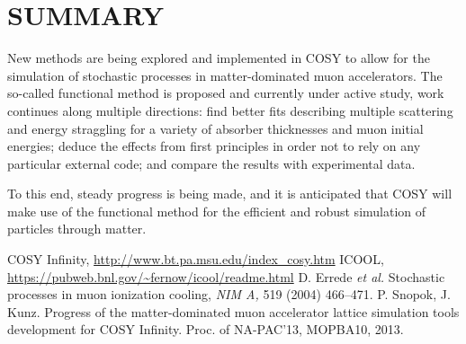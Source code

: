 \documentclass{jacow}
\begin{document}
\section{SUMMARY}
New methods are being explored and implemented in COSY to allow for the simulation of stochastic processes in matter-dominated muon accelerators. The so-called functional method is proposed and currently under active study, work continues along multiple directions: find better fits describing multiple scattering and energy straggling for a variety of absorber thicknesses and muon initial energies; deduce the effects from first principles in order not to rely on any particular external code; and compare the results with experimental data.

To this end, steady progress is being made, and it is anticipated that COSY will make use of the functional method for the efficient and robust simulation of particles through matter.

\begin{thebibliography}{9}   %
COSY Infinity, \url{http://www.bt.pa.msu.edu/index_cosy.htm}
ICOOL, \url{https://pubweb.bnl.gov/~fernow/icool/readme.html}
D. Errede \emph{et al.} Stochastic processes in muon ionization cooling, \emph {NIM A,} 519 (2004) 466--471.
P. Snopok, J. Kunz. Progress of the matter-dominated muon accelerator lattice simulation tools development for COSY Infinity. Proc. of NA-PAC'13, MOPBA10, 2013.

\end{thebibliography}
\mbox{}
\end{document}
